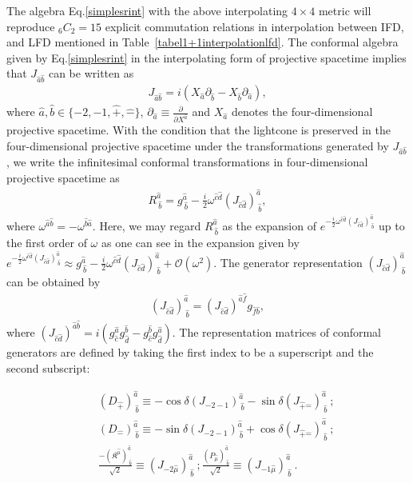 \documentclass[%
 reprint,
superscriptaddress,
 amsmath,amssymb,
 aps,
]{revtex4-2}
\begin{document}
The algebra Eq.\eqref{simplesrint} with the above interpolating $4\times4$ metric will reproduce $_6C_2 = 15$ explicit commutation relations in interpolation between IFD, and LFD mentioned in Table~\ref {tabel1+1interpolationlfd}. The conformal algebra given by Eq.\eqref{simplesrint} in the interpolating form of projective spacetime implies that $J_{\hat{a}\hat{b}}$ can be written as
\begin{align}
    J_{\hat{a}\hat{b}}=i(X_{\hat{a}}\partial_{\hat{b}}-X_{\hat{b}}\partial_{\hat{a}}),
\end{align}
where $\hat{a},\hat{b}\in\{-2,-1,\hat{+},\hat{-}\}$, $\partial_{\hat{a}}\equiv\frac{\partial}{\partial X^{\hat{a}}}$ and $X_{\hat{a}}$ denotes the four-dimensional projective spacetime. With the condition that the lightcone is preserved in the four-dimensional projective spacetime under the transformations generated by $ J_{\hat{a}\hat{b}}$, we write the infinitesimal conformal transformations in four-dimensional projective spacetime as
\begin{align}
R^{\hat{a}}_{~\hat{b}}=g^{\hat{a}}_{~\hat{b}}-\frac{i}{2}\omega^{\hat{c}\hat{d}}(J_{\hat{c}\hat{d}})^{\hat{a}}_{~\hat{b}},\label{R_conformalTransformations}
\end{align}
where $\omega^{\hat{a}\hat{b}}=-\omega^{\hat{b}\hat{a}}$. Here, we may regard $R^{\hat{a}}_{~\hat{b}}$ as the expansion of $e^{-\frac{i}{2}\omega^{\hat{c}\hat{d}}(J_{\hat{c}\hat{d}})^{\hat{a}}_{~\hat{b}}}$ up to the first order of $\omega$ as one can see in the expansion given by 
$e^{-\frac{i}{2}\omega^{\hat{c}\hat{d}}(J_{\hat{c}\hat{d}})^{\hat{a}}_{~\hat{b}}} \approx  g^{\hat{a}}_{~\hat{b}}-\frac{i}{2}\omega^{\hat{c}\hat{d}}(J_{\hat{c}\hat{d}})^{\hat{a}}_{~\hat{b}}+\mathcal{O}(\omega^2)$.
The generator representation $(J_{\hat{c}\hat{d}})^{\hat{a}}_{~\hat{b}}$ can be obtained by
\begin{align}
    (J_{\hat{c}\hat{d}})^{\hat{a}}_{~\hat{b}}=(J_{\hat{c}\hat{d}})^{\hat{a}\hat{f}}g_{\hat{f}\hat{b}},
\end{align}
where $(J_{{\hat{c}}{\hat{d}}})^{{\hat{a}}{\hat{b}}}=i(g_{\hat{c}}^{\hat{a}} g_{\hat{d}}^{\hat{b}}-g_{\hat{c}}^{\hat{b}} g_{\hat{d}}^{\hat{a}})$. The representation matrices of conformal generators are defined by taking the first  index to be a superscript and the second subscript:

\begin{eqnarray}
    &&(D_{\hat{+}})^{\hat{a}}_{~\hat{b}}\equiv -\cos{\delta}(J_{-2-1})^{\hat{a}}_{~\hat{b}}-\sin{\delta}(J_{\hat{+}\hat{-}})^{\hat{a}}_{~\hat{b}}~;\nonumber\\
    &&(D_{\hat{-}})^{\hat{a}}_{~\hat{b}}\equiv -\sin{\delta}(J_{-2-1})^{\hat{a}}_{~\hat{b}}+\cos{\delta}(J_{\hat{+}\hat{-}})^{\hat{a}}_{~\hat{b}}~;\nonumber\\
    &&\frac{-(\mathfrak{K}^{\hat{\mu}})^{\hat{a}}_{~\hat{b}}}{\sqrt{2}}\equiv (J_{-2\hat{\mu}})^{\hat{a}}_{~\hat{b}}~;
    \frac{(P_{\hat{\mu}})^{\hat{a}}_{~\hat{b}}}{\sqrt{2}}\equiv (J_{-1\hat{\mu}})^{\hat{a}}_{~\hat{b}}~.
    \label{implicit6x6}
\end{eqnarray}
\end{document}
